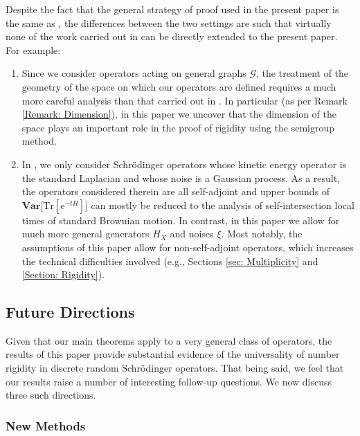 \documentclass{amsart}
\numberwithin{equation}{section}
\theoremstyle{definition}
\newcommand\mbf{\mathbf}
\newcommand\mr{\mathrm}
\newcommand\ms{\mathscr}
\begin{document}
Despite the fact that the general strategy of proof used in the present paper is the same as
\cite{GGL20}, the differences between the two settings are such that
virtually none of the work carried out in \cite{GGL20} can be directly
extended to the present paper. For example:
\begin{enumerate}
\item Since we consider operators acting on general graphs $\ms G$,
the treatment of the geometry of the space on which our operators are
defined requires a much more careful analysis than that carried out in
\cite{GGL20}. In particular (as per Remark
\ref{Remark: Dimension}), in this paper we uncover
that the dimension of the space plays an important role in the proof
of rigidity using the semigroup method.
\item In \cite{GGL20}, we only consider Schr\"odinger
operators whose kinetic energy operator is the standard Laplacian and whose noise
is a Gaussian process. As a result, the operators considered therein are all self-adjoint
and upper bounds of $\mbf{Var}\big[\mr{Tr}[\mr e^{-t H}]\big]$ can mostly be reduced to the analysis
of self-intersection local times of standard Brownian motion.
In contrast, in this paper we allow for much more general generators $H_X$ and noises $\xi$.
Most notably, the assumptions of this paper allow for non-self-adjoint operators, which
increases the technical difficulties involved (e.g., Sections \ref{sec: Multiplicity}
and \ref{Section: Rigidity}).
\end{enumerate}
 
%

\subsection{Future Directions}

%

Given that our main theorems apply to a very general class of operators,
the results of this paper provide substantial evidence of the universality
of number rigidity in discrete random Schr\"odinger operators.
That being said, we feel that our results raise a number of interesting
follow-up questions. We now discuss three such directions.

%

\subsubsection{New Methods}
\label{sec:new methods}
\end{document}
